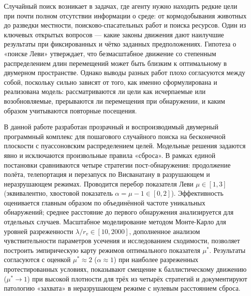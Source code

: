 Случайный поиск возникает в задачах, где агенту нужно находить редкие цели при почти полном отсутствии информации о среде: от кормодобывания животных до разведки местности, поисково-спасательных работ и поиска ресурсов. Один из ключевых открытых вопросов — какие законы движения дают наилучшие результаты при фиксированных и чётко заданных предположениях. Гипотеза о «поиске Леви» утверждает, что безмасштабное движение со степенным распределением длин перемещений может быть близким к оптимальному в двумерном пространстве. Однако выводы разных работ плохо согласуются между собой, поскольку сильно зависят от того, как именно сформулирована и реализована модель: рассматриваются ли цели как исчерпаемые или возобновляемые, прерываются ли перемещения при обнаружении, и каким образом учитываются повторные посещения.

В данной работе разработан прозрачный и воспроизводимый двумерный программный комплекс для пошагового случайного поиска на бесконечной плоскости с пуассоновским распределением целей. Модельные решения задаются явно и исключаются произвольные правила «сброса». В рамках единой постановки сравниваются четыре стратегии пост-обнаружения: продолжение полёта, телепортация и перезапуск по Висванатану в разрушающем и неразрушающем режимах. Проводится перебор показателя Леви $\mu \in [1, 3]$ (эквивалентно, хвостовой показатель $\alpha = \mu - 1 \in [0, 2]$). Эффективность оценивается главным образом по объединённой частоте уникальных обнаружений; среднее расстояние до первого обнаружения анализируется для отдельных случаев. Масштабное моделирование методом Монте-Карло для уровней разреженности $\lambda/r_v \in [10, 2000]$, дополненное анализом чувствительности параметров усечения и исследованием сходимости, позволяет построить эмпирическую карту режимов оптимального показателя $\mu^*$. Результаты согласуются с оценкой $\mu^* \approx 2$ ($\alpha \approx 1$) при наиболее разреженных протестированных условиях, показывают смещение к баллистическому движению ($\mu^* \to 1$) при высокой плотности для трёх из четырёх стратегий и документируют патологию «захвата» в неразрушающем режиме с нулевым расстоянием сброса.
